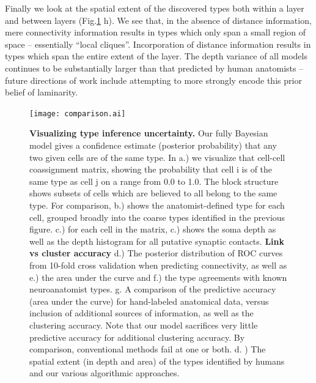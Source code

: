 \documentclass{article}
\begin{document}
Finally we look at the spatial extent of the discovered types both
within a layer and between layers (Fig.\ref{fig:mouseretina_compare}
h). We see that, in the absence of distance information, mere
connectivity information results in types which only span a small
region of space -- essentially “local cliques”. Incorporation of
distance information results in types which span the entire extent of
the layer. The depth variance of all models continues to be
substantially larger than that predicted by human anatomists -- future
directions of work include attempting to more strongly encode this
prior belief of laminarity.


\begin{figure}
  \centering 
  \centerline{\texttt{[image: comparison.ai]}}
  \caption{\textbf{Visualizing type inference uncertainty.} Our fully
    Bayesian model gives a confidence estimate (posterior probability)
    that any two given cells are of the same type. In a.) we visualize
    that cell-cell coassignment matrix, showing the probability that
    cell i is of the same type as cell j on a range from 0.0 to
    1.0. The block structure shows subsets of cells which are believed
    to all belong to the same type. For comparison, b.) shows the
    anatomist-defined type for each cell, grouped broadly into the
    coarse types identified in the previous figure. c.) for each cell
    in the matrix, c.) shows the soma depth as well as the depth
    histogram for all putative synaptic contacts. \textbf{Link vs
      cluster accuracy} d.) The posterior distribution of ROC curves
    from 10-fold cross validation when predicting connectivity, as
    well as e.) the area under the curve and f.) the type agreements
    with known neuroanatomist types. g. A comparison of the predictive
    accuracy (area under the curve) for hand-labeled anatomical data,
    versus inclusion of additional sources of information, as well as
    the clustering accuracy. Note that our model sacrifices very
    little predictive accuracy for additional clustering accuracy. By
    comparison, conventional methods fail at one or both.  d. ) The
    spatial extent (in depth and area) of the types identified by
    humans and our various algorithmic approaches.}
\label{fig:mouseretina_compare}
\end{figure}


\end{document}
